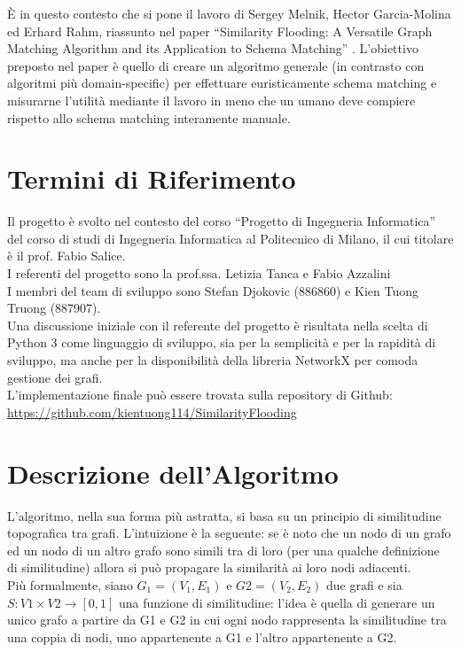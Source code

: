 \documentclass[a4paper,10pt]{article}
\begin{document}
È in questo contesto che si pone il lavoro di Sergey Melnik, Hector Garcia-Molina ed Erhard Rahm, riassunto nel paper “Similarity Flooding: A Versatile Graph Matching Algorithm
and its Application to Schema Matching” \cite{sfpaper}. L’obiettivo preposto nel paper è quello di creare un algoritmo generale (in contrasto con algoritmi più domain-specific) per effettuare euristicamente schema matching e misurarne l’utilità mediante il lavoro in meno che un umano deve compiere rispetto allo schema matching interamente manuale.


\section{Termini di Riferimento}

Il progetto è svolto nel contesto del corso “Progetto di Ingegneria Informatica” del corso di studi di Ingegneria Informatica al Politecnico di Milano, il cui titolare è il prof. Fabio Salice.\\

I referenti del progetto sono la prof.ssa. Letizia Tanca e Fabio Azzalini\\

I membri del team di sviluppo sono Stefan Djokovic (886860) e Kien Tuong Truong (887907).\\

Una discussione iniziale con il referente del progetto è risultata nella scelta di Python 3 come linguaggio di sviluppo, sia per la semplicità e per la rapidità di sviluppo, ma anche per la disponibilità della libreria NetworkX per comoda gestione dei grafi.\\

L’implementazione finale può essere trovata sulla repository di Github:\\
\url{https://github.com/kientuong114/SimilarityFlooding}


\section{Descrizione dell'Algoritmo}
\label{descript_alg}

L’algoritmo, nella sua forma più astratta, si basa su un principio di similitudine topografica tra grafi. L’intuizione è la seguente: se è noto che un nodo di un grafo ed un nodo di un altro grafo sono simili tra di loro (per una qualche definizione di similitudine) allora si può propagare la similarità ai loro nodi adiacenti.\\
Più formalmente, siano $G_1 = (V_1, E_1)$ e $G2 = (V_2, E_2) $ due grafi e sia \\ $S: V1\times V2 \to [0, 1]$ una funzione di similitudine: l’idea è quella di generare un unico grafo a partire da G1 e G2 in cui ogni nodo rappresenta la similitudine tra una coppia di nodi, uno appartenente a G1 e l’altro appartenente a G2.\\
\end{document}
